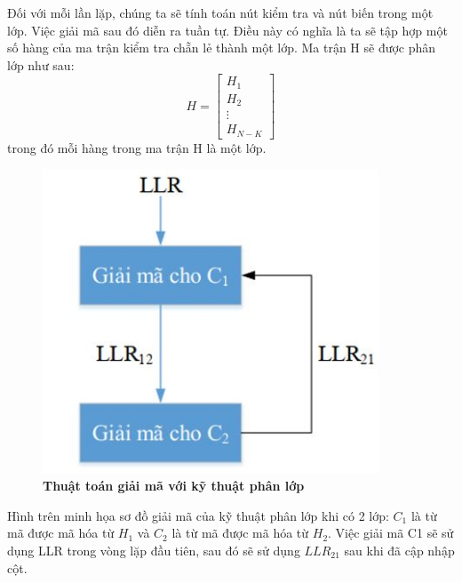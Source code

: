 \documentclass{article}
\begin{document}
Đối với mỗi lần lặp, chúng ta sẽ tính toán nút kiểm tra và nút biến trong một lớp. Việc giải mã sau đó diễn ra tuần tự. Điều này có nghĩa là ta sẽ tập hợp một số hàng của ma trận kiểm tra chẵn lẻ thành một lớp. Ma trận H sẽ được phân lớp như sau:
  \begin{equation}\label{139}
      H = 
      \begin{bmatrix}
        H_1 \\
        H_2 \\
        \vdots \\
        H_{N-K}
      \end{bmatrix}
  \end{equation}
 trong đó mỗi hàng trong ma trận H là một lớp.
 \begin{figure}[H]
    \centering
    \includegraphics[width=10cm]{images/giaimaphanlop.JPG}
    \caption[Thuật toán giải mã với kỹ thuật phân lớp]{\bfseries\fontsize{12pt}{0pt} \selectfont Thuật toán giải mã với kỹ thuật phân lớp} %
    \label{hinh21}
\end{figure}
 Hình trên minh họa sơ đồ giải mã của kỹ thuật phân lớp khi có 2 lớp: $C_1$ là từ mã được mã hóa từ $H_1$ và $C_2$ là từ mã được mã hóa từ $H_2$. Việc giải mã C1 sẽ sử dụng LLR trong vòng lặp đầu tiên, sau đó sẽ sử dụng $LLR_{21}$ sau khi đã cập nhập cột.
\end{document}
